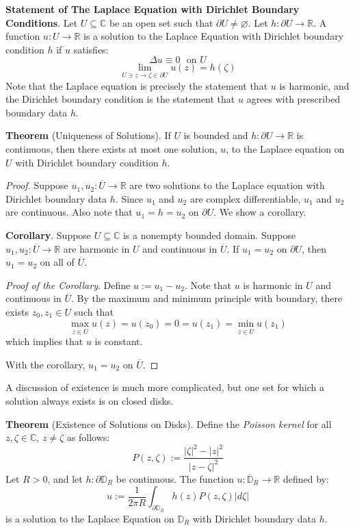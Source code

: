 \begin{framed}
    \textbf{Statement of The Laplace Equation with Dirichlet Boundary Conditions}. Let $U\subseteq\mathbb{C}$ be an open set such that $\partial U \neq \varnothing$. Let $h:\partial U \to \mathbb{R}$. A function $u:U\to \mathbb{R}$ is a solution to the Laplace Equation with Dirichlet boundary condition $h$ if $u$ satisfies: 
        \[\Delta u \equiv 0\ \ \ \text{on }U \tag{Laplace's Equation}\]
        \[\displaystyle\lim_{U\ni z \to \zeta\in \partial U} u(z) = h(\zeta) \tag{Dirichlet BC}\] Note that the Laplace equation is precisely the statement that $u$ is harmonic, and the Dirichlet boundary condition is the statement that $u$ agrees with prescribed boundary data $h$.

        \textbf{Theorem} (Uniqueness of Solutions). If $U$ is bounded and $h:\partial U\to \mathbb{R}$ is continuous, then there exists at most one solution, $u$, to the Laplace equation on $U$ with Dirichlet boundary condition $h$.

        \begin{proof}
            Suppose $u_1,u_2:\overline{U}\to\mathbb{R}$ are two solutions to the Laplace equation with Dirichlet boundary data $h$. Since $u_1$ and $u_2$ are complex differentiable, $u_1$ and $u_2$ are continuous. Also note that $u_1=h=u_2$ on $\partial U$. We show a corollary.

            \textbf{Corollary}. Suppose $U\subseteq\mathbb{C}$ is a nonempty bounded domain. Suppose $u_1,u_2:\overline{U}\to\mathbb{R}$ are harmonic in $U$ and continuous in $\overline{U}$. If $u_1=u_2$ on $\partial U$, then $u_1=u_2$ on all of $\overline{U}$.

            \textit{Proof of the Corollary}. Define $u:= u_1-u_2$. Note that $u$ is harmonic in $U$ and continuous in $\overline{U}$. By the maximum and minimum principle with boundary, there exists $z_0,z_1\in U$ such that \[\max_{z\in\overline{U}} u(z) = u(z_0)= 0 = u(z_1)=\min_{z\in\overline{U}} u(z_1)\] which implies that $u$ is constant.

            With the corollary, $u_1=u_2$ on $\overline{U}$.
        \end{proof}

        A discussion of existence is much more complicated, but one set for which a solution always exists is on closed disks.

        \textbf{Theorem} (Existence of Solutions on Disks). Define the \textit{Poisson kernel} for all $z,\zeta\in\mathbb{C}$, $z\neq \zeta$ as follows: \[P(z,\zeta) := \frac{|\zeta|^2-|z|^2}{|z-\zeta|^2}\] Let $R>0$, and let $h:\partial\mathbb{D}_R$ be continuous. The function $u:\overline{\mathbb{D}}_R\to\mathbb{R}$ defined by: \[u:=\frac{1}{2\pi R} \int_{\partial\mathbb{D}_R} h(z)P(z,\zeta)|d\zeta|\tag{Poisson's Integral Formula}\] is a solution to the Laplace Equation on $\mathbb{D}_R$ with Dirichlet boundary data $h$.


\end{framed}
